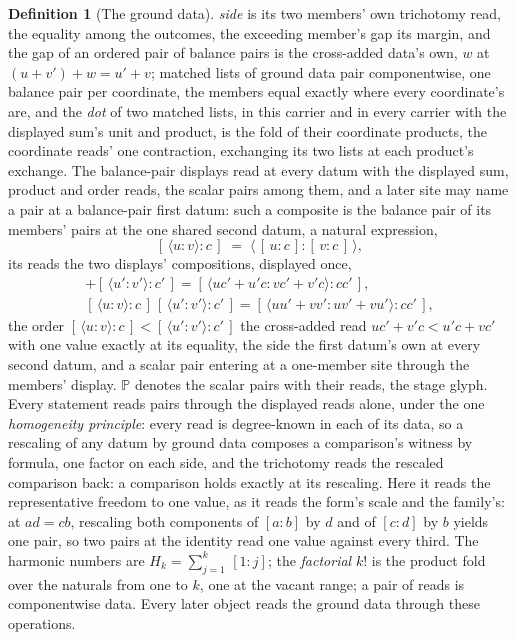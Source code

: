 \documentclass[11pt]{article}
\theoremstyle{definition}
\newtheorem{definition}{Definition}
\begin{document}
\begin{definition}[The ground data]
\emph{side} is its two members' own trichotomy read, the equality
among the outcomes, the exceeding member's gap its margin, and the
gap of an ordered pair of balance pairs is the cross-added data's
own, $w$ at $(u+v')+w=u'+v$; matched lists of ground data pair
componentwise, one balance pair per coordinate, the members equal
exactly where every coordinate's are, and the \emph{dot} of two
matched lists, in this carrier and in every carrier with the
displayed sum's unit and product, is the fold of their coordinate
products, the coordinate reads' one contraction, exchanging its two
lists at each product's exchange. The balance-pair
displays read at every datum with the displayed sum, product and
order reads, the scalar pairs among them, and a later site may name
a pair at a balance-pair first datum: such a composite is the
balance pair of its members' pairs at the one shared second datum,
a natural expression,
\[
[\,\langle u\!:\!v\rangle:c\,]\;=\;
\big\langle\,[\,u:c\,]\!:\![\,v:c\,]\,\big\rangle ,
\]
its reads the two displays' compositions, displayed once,
\begin{gather*}
[\,\langle u\!:\!v\rangle:c\,]+[\,\langle u'\!:\!v'\rangle:c'\,]
=[\,\langle uc'{+}u'c\!:\!vc'{+}v'c\rangle:cc'\,],\\
[\,\langle u\!:\!v\rangle:c\,]\,[\,\langle u'\!:\!v'\rangle:c'\,]
=[\,\langle uu'{+}vv'\!:\!uv'{+}vu'\rangle:cc'\,],
\end{gather*}
the order
$[\,\langle u\!:\!v\rangle:c\,]<[\,\langle u'\!:\!v'\rangle:c'\,]$
the cross-added read $uc'+v'c<u'c+vc'$ with one value exactly at its
equality, the side the first datum's own at every second datum, and
a scalar pair entering at a one-member site through the members'
display. $\mathbb P$
denotes the scalar pairs with their reads, the stage glyph. Every statement reads
pairs through the displayed reads alone, under the one
\emph{homogeneity principle}: every read is degree-known in each
of its data, so a rescaling of any datum by ground data composes a
comparison's witness by formula, one factor on each side, and the
trichotomy reads the rescaled comparison back: a comparison holds
exactly at its rescaling. Here it reads the representative
freedom to one value, as it
reads the form's scale and the family's: at $ad=cb$, rescaling
both components of $[a\!:\!b]$ by $d$ and of $[c\!:\!d]$ by $b$
yields one pair, so two pairs at the identity read one value
against every third. The harmonic numbers are
$H_k=\sum_{j=1}^{k}\,[1\!:\!j]$; the \emph{factorial} $k!$ is the
product fold over the naturals from one to $k$, one at the vacant
range; a pair of reads is componentwise
data. Every later object reads the ground data through
these operations.

\end{definition}
\end{document}
